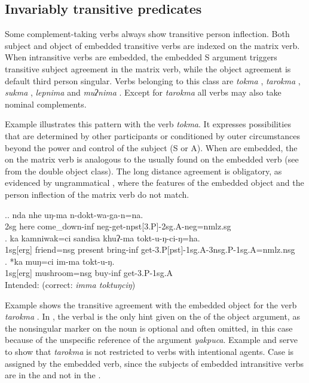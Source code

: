 \subsection{Invariably transitive predicates}

Some complement-taking verbs always show transitive person inflection. Both subject and object of embedded transitive verbs are indexed on the matrix verb. When intransitive verbs are embedded, the embedded S argument triggers transitive subject agreement in the matrix verb, while the object agreement is default third person singular. Verbs belonging to this class are  \emph{tokma} , \emph{tarokma} , \emph{sukma} ,  \emph{lepnima}  and \emph{muʔnima} . Except for \emph{tarokma} all verbs may also take nominal complements. 

Example \Next illustrates this pattern with the verb \emph{tokma}. It expresses possibilities that are determined by other participants or conditioned by outer circumstances beyond the power and control of the subject (S or A). When  are embedded,  the  on the matrix verb is analogous to the  usually found on  the embedded verb (see \Next[b] from the double object class). The long distance agreement is obligatory, as evidenced by ungrammatical \Next[c], where the  features of the embedded object and the person inflection of the matrix verb do not match. 

\ex.\ag. nda nhe uŋ-ma n-dokt-wa-ga-n=na.\\
{\sc 2sg} here come\_down-{\sc inf} {\sc neg}-get{\sc -npst[3.P]-2sg.A-neg=nmlz.sg}\\
 
\bg. ka kamniwak=ci sandisa  khuʔ-ma tokt-u-ŋ-ci-ŋ=ha.\\
{\sc 1sg[erg]} friend{\sc =nsg} present bring-{\sc inf} get-{\sc 3.P[pst]-1sg.A-3nsg.P-1sg.A=nmlz.nsg}\\
	\bg. *ka muŋ=ci im-ma tokt-u-ŋ.\\
		{\sc 1sg[erg]} mushroom{\sc =nsg} buy{\sc -inf} get-{\sc 3.P-1sg.A}\\
	Intended:   (correct: \emph{imma toktuŋciŋ})


Example \Next shows the transitive agreement with the embedded object for the verb \emph{tarokma} . In \Next[a], the verbal  is the only hint given on the  of the object argument, as the nonsingular marker on the noun is optional and often omitted, in this case because of  the unspecific reference of the argument \emph{yakpuca}. Example \Next[b] and \Next[c] serve to show  that \emph{tarokma} is  not restricted to verbs with intentional agents. 
Case is assigned by the embedded verb, since the subjects of embedded intransitive verbs are in the  and not in the . 


